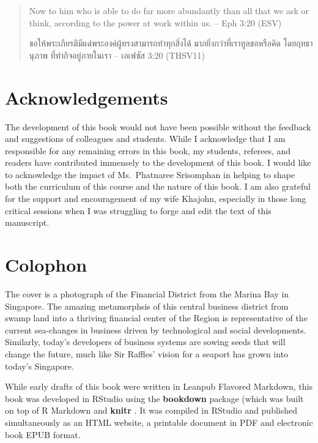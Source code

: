 \documentclass[]{book}
\begin{document}
\begin{quote}
Now to him who is able to do far more abundantly
than all that we ask or think, according
to the power at work within us.
-- Eph 3:20 (ESV)

ขอให้พระเกียรติมีแด่พระองค์ผู้ทรงสามารถทำทุกสิ่งได้
มากยิ่งกว่าที่เราทูลขอหรือคิด โดยฤทธานุภาพ
ที่ทำกิจอยู่ภายในเรา
-- เอเฟซัส 3:20 (THSV11)
\end{quote}

\hypertarget{acknowledgements}{%
\section*{Acknowledgements}\label{acknowledgements}}

The development of this book would not have been possible without the feedback and suggestions of colleagues and students. While I acknowledge that I am responsible for any remaining errors in this book, my students, referees, and readers have contributed immensely to the development of this book. I would like to acknowledge the impact of Ms.~Phatnaree Srisomphan in helping to shape both the curriculum of this course and the nature of this book. I am also grateful for the support and encouragement of my wife Khajohn, especially in those long critical sessions when I was struggling to forge and edit the text of this manuscript.

\hypertarget{colophon}{%
\section*{Colophon}\label{colophon}}

The cover is a photograph of the Financial District from the Marina Bay in Singapore. The amazing metamorphsis of this central business district from swamp land into a thriving financial center of the Region is representative of the current sea-changes in business driven by technological and social developments. Similarly, today's developers of business systems are sowing seeds that will change the future, much like Sir Raffles' vision for a seaport has grown into today's Singapore.

While early drafts of this book were written in Leanpub Flavored Markdown, this book was developed in RStudio using the \textbf{bookdown} package \citep{R-bookdown} (which was built on top of R Markdown and \textbf{knitr} \citep{xie2015}. It was compiled in RStudio and published simultaneously as an HTML website, a printable document in PDF and electronic book EPUB format.
\end{document}
